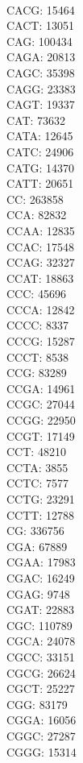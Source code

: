 \begin{multicols}{7}
\\ CACG:	15464
\\ CACT:	13051
\\ CAG:	100434
\\ CAGA:	20813
\\ CAGC:	35398
\\ CAGG:	23383
\\ CAGT:	19337
\\ CAT:	73632
\\ CATA:	12645
\\ CATC:	24906
\\ CATG:	14370
\\ CATT:	20651
\\ CC:	263858
\\ CCA:	82832
\\ CCAA:	12835
\\ CCAC:	17548
\\ CCAG:	32327
\\ CCAT:	18863
\\ CCC:	45696
\\ CCCA:	12842
\\ CCCC:	8337
\\ CCCG:	15287
\\ CCCT:	8538
\\ CCG:	83289
\\ CCGA:	14961
\\ CCGC:	27044
\\ CCGG:	22950
\\ CCGT:	17149
\\ CCT:	48210
\\ CCTA:	3855
\\ CCTC:	7577
\\ CCTG:	23291
\\ CCTT:	12788
\\ CG:	336756
\\ CGA:	67889
\\ CGAA:	17983
\\ CGAC:	16249
\\ CGAG:	9748
\\ CGAT:	22883
\\ CGC:	110789
\\ CGCA:	24078
\\ CGCC:	33151
\\ CGCG:	26624
\\ CGCT:	25227
\\ CGG:	83179
\\ CGGA:	16056
\\ CGGC:	27287
\\ CGGG:	15314

\end{multicols}
